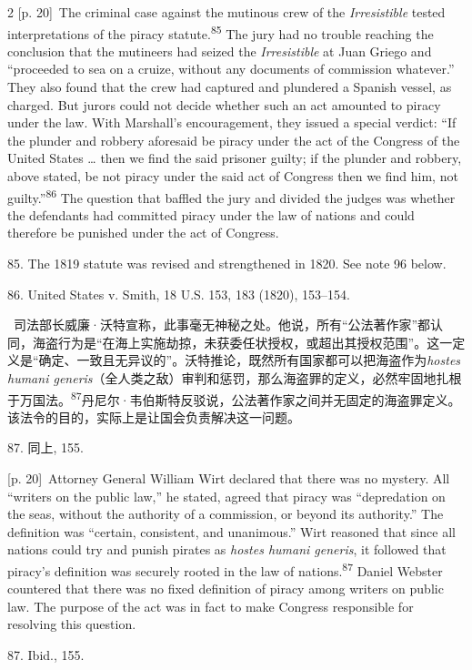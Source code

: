 \documentclass[10pt,a4paper]{article}
\begin{document}
\begin{paracol}{2}
\switchcolumn
{\scriptsize\color{gray} [p. 20]}\ The criminal case against the mutinous crew of the \textit{Irresistible} tested interpretations of the piracy statute.\nobreak\textsuperscript{85} The jury had no trouble reaching the conclusion that the mutineers had seized the \textit{Irresistible} at Juan Griego and “proceeded to sea on a cruize, without any documents of commission whatever.” They also found that the crew had captured and plundered a Spanish vessel, as charged. But jurors could not decide whether such an act amounted to piracy under the law. With Marshall’s encouragement, they issued a special verdict: “If the plunder and robbery aforesaid be piracy under the act of the Congress of the United States … then we find the said prisoner guilty; if the plunder and robbery, above stated, be not piracy under the said act of Congress then we find him, not guilty.”\nobreak\textsuperscript{86} The question that baffled the jury and divided the judges was whether the defendants had committed piracy under the law of nations and could therefore be punished under the act of Congress.\par{\small 85. The 1819 statute was revised and strengthened in 1820. See note 96 below.\par}{\small 86. United States v. Smith, 18 U.S. 153, 183 (1820), 153–154.\par}
\switchcolumn*
{\scriptsize\color{gray} [p. 20]}\ 司法部长威廉·沃特宣称，此事毫无神秘之处。他说，所有“公法著作家”都认同，海盗行为是“在海上实施劫掠，未获委任状授权，或超出其授权范围”。这一定义是“确定、一致且无异议的”。沃特推论，既然所有国家都可以把海盗作为\textit{hostes humani generis}（全人类之敌）审判和惩罚，那么海盗罪的定义，必然牢固地扎根于万国\mbox{法。\textsuperscript{87}}丹尼尔·韦伯斯特反驳说，公法著作家之间并无固定的海盗罪定义。该法令的目的，实际上是让国会负责解决这一问题。\par{\small 87. 同上, 155.\par}
\switchcolumn
{\scriptsize\color{gray} [p. 20]}\ Attorney General William Wirt declared that there was no mystery. All “writers on the public law,” he stated, agreed that piracy was “depredation on the seas, without the authority of a commission, or beyond its authority.” The definition was “certain, consistent, and unanimous.” Wirt reasoned that since all nations could try and punish pirates as \textit{hostes humani generis}, it followed that piracy’s definition was securely rooted in the law of nations.\nobreak\textsuperscript{87} Daniel Webster countered that there was no fixed definition of piracy among writers on public law. The purpose of the act was in fact to make Congress responsible for resolving this question.\par{\small 87. Ibid., 155.\par}

\end{paracol}
\end{document}
